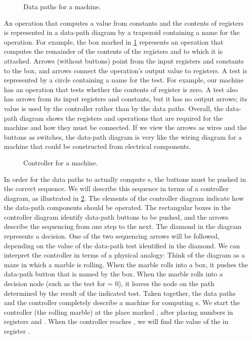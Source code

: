 \begin{figure}[tb]
	\centering
	
	\caption{
		Data paths for a  machine.
	}
	\label{Figure 5.1}
\end{figure}

An operation that computes a value from constants and the contents of registers is represented in a data-path diagram by a trapezoid containing a name for the operation.
For example, the box marked  in \cref{Figure 5.1} represents an operation that computes the remainder of the contents of the registers  and  to which it is attached.
Arrows (without buttons) point from the input registers and constants to the box, and arrows connect the operation’s output value to registers.
A test is represented by a circle containing a name for the test.
For example, our  machine has an operation that tests whether the contents of register  is zero.
A test also has arrows from its input registers and constants, but it has no output arrows;
its value is used by the controller rather than by the data paths.
Overall, the data-path diagram shows the registers and operations that are required for the machine and how they must be connected.
If we view the arrows as wires and the  buttons as switches, the data-path diagram is very like the wiring diagram for a machine that could be constructed from electrical components.

\begin{figure}[tb]
	\centering
	
	\caption{
		Controller for a  machine.
	}
	\label{Figure 5.2}
\end{figure}

In order for the data paths to actually compute s, the buttons must be pushed in the correct sequence.
We will describe this sequence in terms of a controller diagram, as illustrated in \cref{Figure 5.2}.
The elements of the controller diagram indicate how the data-path components should be operated.
The rectangular boxes in the controller diagram identify data-path buttons to be pushed, and the arrows describe the sequencing from one step to the next.
The diamond in the diagram represents a decision.
One of the two sequencing arrows will be followed, depending on the value of the data-path test identified in the diamond.
We can interpret the controller in terms of a physical analogy:
Think of the diagram as a maze in which a marble is rolling.
When the marble rolls into a box, it pushes the data-path button that is named by the box.
When the marble rolls into a decision node (such as the test for  = 0), it leaves the node on the path determined by the result of the indicated test.
Taken together, the data paths and the controller completely describe a machine for computing s.
We start the controller (the rolling marble) at the place marked , after placing numbers in registers  and .
When the controller reaches , we will find the value of the  in register .



